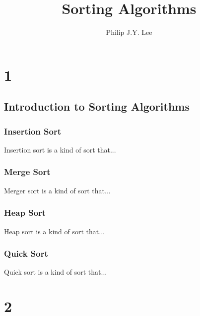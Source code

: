 \documentclass{report}
\begin{document}
\title{Sorting Algorithms}
\author{Philip J.Y. Lee}
\maketitle

\chapter{1}
\section{Introduction to Sorting Algorithms}
\subsection{Insertion Sort}
Insertion sort is a kind of sort that...
\subsection{Merge Sort}
Merger sort is a kind of sort that...
\subsection{Heap Sort}
Heap sort is a kind of sort that...
\subsection{Quick Sort}
Quick sort is a kind of sort that...

\chapter{2}
\end{document}
